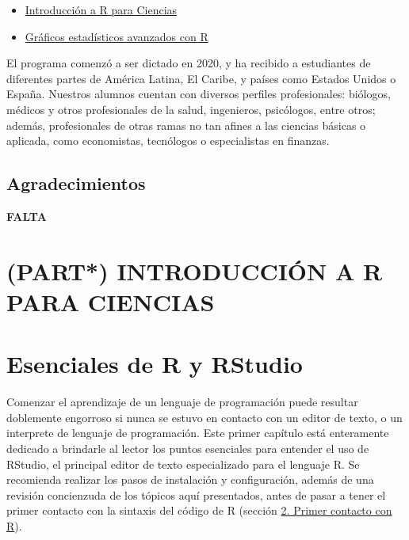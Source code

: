 \documentclass[
]{article}
\providecommand{\tightlist}{%
  \setlength{\itemsep}{0pt}\setlength{\parskip}{0pt}}
\theoremstyle{definition}
\theoremstyle{definition}
\theoremstyle{definition}
\theoremstyle{definition}
\theoremstyle{remark}
\begin{document}
\begin{itemize}
\tightlist
\item
  \href{https://www.masterx.org/courses/introduccion-a-r-para-ciencias221}{Introducción a R para Ciencias}
\item
  \href{https://www.masterx.org/courses/graficosggplot2-221}{Gráficos estadísticos avanzados con R}
\end{itemize}

El programa comenzó a ser dictado en 2020, y ha recibido a estudiantes de diferentes partes de América Latina, El Caribe, y países como Estados Unidos o España. Nuestros alumnos cuentan con diversos perfiles profesionales: biólogos, médicos y otros profesionales de la salud, ingenieros, psicólogos, entre otros; además, profesionales de otras ramas no tan afines a las ciencias básicas o aplicada, como economistas, tecnólogos o especialistas en finanzas.

\hypertarget{agradecimientos}{%
\subsection*{Agradecimientos}\label{agradecimientos}}

{\textbf{FALTA}}

\hypertarget{part-introducciuxf3n-a-r-para-ciencias}{%
\section*{\texorpdfstring{(PART*) INTRODUCCIÓN A R PARA CIENCIAS }{(PART*) INTRODUCCIÓN A  R PARA CIENCIAS }}\label{part-introducciuxf3n-a-r-para-ciencias}}

\hypertarget{esencialesRRStudio}{%
\section{\texorpdfstring{\textbf{Esenciales de R y RStudio}}{Esenciales de R y RStudio}}\label{esencialesRRStudio}}

Comenzar el aprendizaje de un lenguaje de programación puede resultar doblemente engorroso si nunca se estuvo en contacto con un editor de texto, o un interprete de lenguaje de programación. Este primer capítulo está enteramente dedicado a brindarle al lector los puntos esenciales para entender el uso de RStudio, el principal editor de texto especializado para el lenguaje R. Se recomienda realizar los pasos de instalación y configuración, además de una revisión concienzuda de los tópicos aquí presentados, antes de pasar a tener el primer contacto con la sintaxis del código de R (sección \protect\hyperlink{rbasico}{2. Primer contacto con R}).
\end{document}
